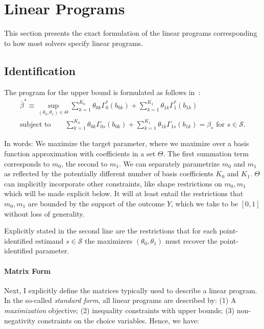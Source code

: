 \documentclass[12pt,a4paper,english]{article} %
\numberwithin{equation}{section}
\theoremstyle{definition}
\theoremstyle{remark}
\theoremstyle{plain}
\begin{document}
\clearpage
\newpage

\section{Linear Programs}\label{app_sec:linear_programs}
This section presents the exact formulation of the linear programs corresponding to how most solvers specify linear programs.

\subsection{Identification}

The program for the upper bound is formulated as follows in~\cite{mogstad2018using}:
\begin{align}
  \overline{\beta}^* \equiv \sup_{(\theta_0, \theta_1)\in\Theta} \sum_{k=1}^{K_0}\theta_{0k}\Gamma^*_0(b_{0k}) + \sum_{k=1}^{K_1}\theta_{1k}\Gamma^*_1(b_{1k}) \\
  \text{subject to} \qquad \sum_{k=1}^{K_0}\theta_{0k}\Gamma_{0s}(b_{0k}) + \sum_{k=1}^{K_1}\theta_{1k}\Gamma_{1s}(b_{1k}) = \beta_s \text{ for } s \in \mathcal{S}.
\end{align}

In words: We maximize the target parameter, where we maximize over a basis function approximation with coefficients in a set $\Theta$.
The first summation term corresponds to $m_0$, the second to $m_1$.
We can separately parametrize $m_0$ and $m_1$ as reflected by the potentially different number of basis coefficients $K_0$ and $K_1$.
$\Theta$ can implicitly incorporate other constraints, like shape restrictions on $m_0, m_1$ which will be made explicit below.
It will at least entail the restrictions that $m_0, m_1$ are bounded by the support of the outcome $Y$, which we take to be $[0,1]$ without loss of generality.

Explicitly stated in the second line are the restrictions that for each point-identified estimand $s\in\mathcal{S}$ the maximizers $(\theta_0, \theta_1)$ must recover the point-identified parameter.

\paragraph{Matrix Form}
Next, I explicitly define the matrices typically used to describe a linear program.
In the so-called \textit{standard form}, all linear programs are described by:
(1) A \textit{maximization} objective; (2) inequality constraints with upper bounds; (3) non-negativity constraints on the choice variables.
Hence, we have:
\end{document}
